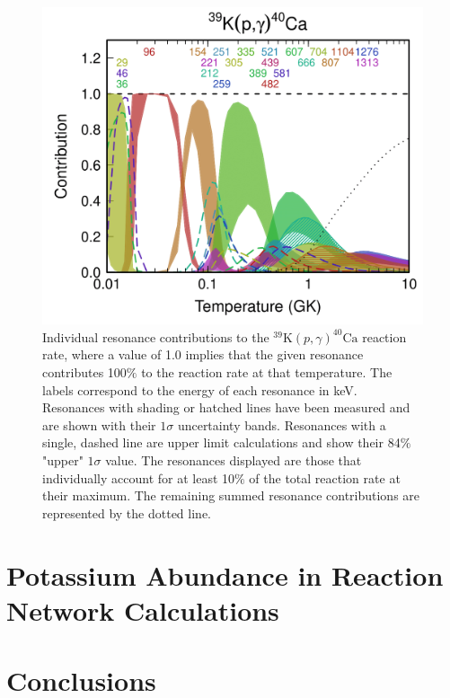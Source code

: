\begin{figure}[t]
\includegraphics[width=6.5in]{Chapter-6/figs/contrib.png} %
\caption{\label{fig:contrib}Individual resonance contributions to the $^{39}\mathrm{K}(p,\gamma)^{40}\mathrm{Ca}$ reaction rate, where a value of 1.0 implies that the given resonance contributes 100$\%$ to the reaction rate at that temperature. The labels correspond to the energy of each resonance in keV. Resonances with shading or hatched lines have been measured and are shown with their $1\sigma$ uncertainty bands. Resonances with a single, dashed line are upper limit calculations and show their 84$\%$ "upper" $1\sigma$ value. The resonances displayed are those that individually account for at least 10$\%$ of the total reaction rate at their maximum. The remaining summed resonance contributions are represented by the dotted line.}
\end{figure}

\section{Potassium Abundance in Reaction Network Calculations}


\section{Conclusions}


